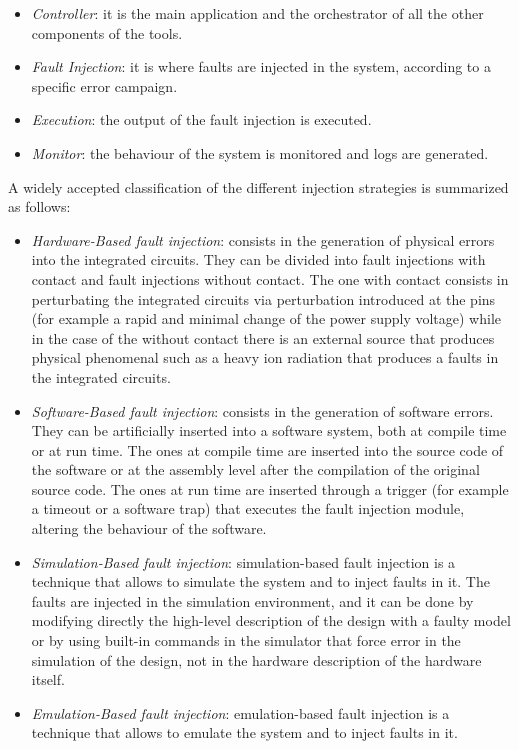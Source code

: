 \begin{itemize}
    \item \textit{Controller}: it is the main application and the orchestrator of all the other components of the tools.
    \item \textit{Fault Injection}: it is where faults are injected in the system, according to a specific error campaign.
    \item \textit{Execution}: the output of the fault injection is executed.
    \item \textit{Monitor}: the behaviour of the system is monitored and logs are generated.
\end{itemize}

A widely accepted classification of the different injection strategies is summarized as follows:

\begin{itemize}
    \item \textit{Hardware-Based fault injection}: consists in the generation of physical errors into the integrated circuits. They can be divided into fault injections with contact and fault injections without contact. The one with contact consists in perturbating the integrated circuits via perturbation introduced at the pins (for example a rapid and minimal change of the power supply voltage) while in the case of the without contact there is an external source that produces physical phenomenal such as a heavy ion radiation that produces a faults in the integrated circuits.
    \item \textit{Software-Based fault injection}: consists in the generation of software errors. They can be artificially inserted into a software system, both at compile time or at run time. The ones at compile time \cite{fithesisdrizz} are inserted into the source code of the software or at the assembly level after the compilation of the original source code. The ones at run time are inserted through a trigger (for example a timeout or a software trap) that executes the fault injection module, altering the behaviour of the software.
    \item \textit{Simulation-Based fault injection}: simulation-based fault injection is a technique that allows to simulate the system and to inject faults in it. The faults are injected in the simulation environment, and it can be done by modifying directly the high-level description of the design with a faulty model or by using built-in commands in the simulator that force error in the simulation of the design, not in the hardware description of the hardware itself.
    \item \textit{Emulation-Based fault injection}: emulation-based fault injection is a technique that allows to emulate the system and to inject faults in it. 
\end{itemize}